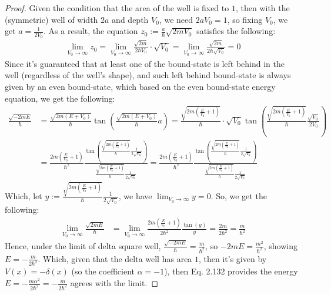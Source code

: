 \documentclass{article}
\begin{document}
\begin{proof}
    Given the condition that the area of the well is fixed to $1$, then with the (symmetric) well of width $2a$ and depth $V_0$, we need $2aV_0=1$, so fixing $V_0$, we get $a=\frac{1}{2V_0}$. As a result, the equation $z_0 :=\frac{a}{\hbar}\sqrt{2mV_0}$ satisfies the following:
    \begin{align}
        \lim_{V_0\rightarrow \infty}z_0 = \lim_{V_0\rightarrow \infty}\frac{\sqrt{2m}}{2\hbar V_0}\cdot \sqrt{V_0} = \lim_{V_0\rightarrow \infty}\frac{\sqrt{2m}}{2\hbar \sqrt{V_0}} = 0
    \end{align}
    Since it's guaranteed that at least one of the bound-state is left behind in the well (regardless of the well's shape), and such left behind bound-state is always given by an even bound-state, which based on the even bound-state energy equation, we get the following:
    \begin{align}
        \frac{\sqrt{-2mE}}{\hbar} &=\frac{\sqrt{2m(E+V_0)}}{\hbar}\tan\left(\frac{\sqrt{2m(E+V_0)}}{\hbar}a\right)=\frac{\sqrt{2m(\frac{E}{V_0}+1)}}{\hbar}\cdot\sqrt{V_0}\tan\left(\frac{\sqrt{2m(\frac{E}{V_0}+1)}}{\hbar}\frac{\sqrt{V_0}}{2V_0}\right)\\
        &= \frac{2m(\frac{E}{V_0}+1)}{\hbar^2}\frac{\tan\left(\frac{\sqrt{2m(\frac{E}{V_0}+1)}}{\hbar}\frac{1}{2\sqrt{V_0}}\right)}{\frac{\sqrt{2m(\frac{E}{V_0}+1)}}{\hbar}\frac{1}{2\sqrt{V_0}}} = \frac{2m(\frac{E}{V_0}+1)}{\hbar^2}\frac{\tan\left(\frac{\sqrt{2m(\frac{E}{V_0}+1)}}{\hbar}\frac{1}{2\sqrt{V_0}}\right)}{\frac{\sqrt{2m(\frac{E}{V_0}+1)}}{\hbar}\frac{1}{2\sqrt{V_0}}}
    \end{align}
    Which, let $y := \frac{\sqrt{2m(\frac{E}{V_0}+1)}}{\hbar}\frac{1}{2\sqrt{V_0}}$, we have $\lim_{V_0\rightarrow \infty}y = 0$. So, we get the following:
    \begin{align}
        \lim_{V_0\rightarrow\infty}\frac{\sqrt{2mE}}{\hbar}&=\lim_{V_0\rightarrow\infty}\frac{2m(\frac{E}{V_0}+1)}{2\hbar^2}\frac{\tan(y)}{y} = \frac{2m}{2\hbar^2} = \frac{m}{\hbar^2}
    \end{align}
    Hence, under the limit of delta square well, $\frac{\sqrt{-2mE}}{\hbar}=\frac{m}{\hbar^2}$, so $-2mE = \frac{m^2}{\hbar^2}$, showing $E = -\frac{m}{2\hbar^2}$. Which, given that the delta well has area $1$, then it's given by $V(x)= -\delta(x)$ (so the coefficient $\alpha = -1$), then Eq. 2.132 provides the energy $E = -\frac{m\alpha^2}{2\hbar^2} = -\frac{m}{2\hbar^2}$ agrees with the limit.

    \hfil


\end{proof}
\end{document}

